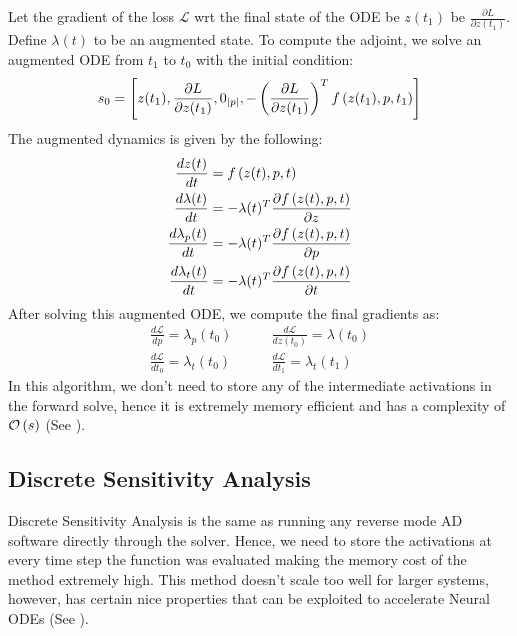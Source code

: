 Let the gradient of the loss $\mathcal{L}$ wrt the final state of the ODE be $z(t_1)$ be $\frac{\partial L}{\partial z(t_1)}$. Define $\lambda(t)$ to be an augmented state. To compute the adjoint, we solve an augmented ODE from $t_1$ to $t_0$ with the initial condition:
%
\begin{equation}
  s_0 = \left[ z(t_1), \frac{\partial L}{\partial z(t_1)}, 0_{|p|}, -\left(\frac{\partial L}{\partial z(t_1)}\right)^T f\left(z(t_1), p, t_1\right)\right]
\end{equation}
%
The augmented dynamics is given by the following:
%
\begin{align}
  \frac{dz(t)}{dt}         & = f\left(z(t), p, t\right)                                           \\
  \frac{d\lambda(t)}{dt}   & = -\lambda(t)^T \frac{\partial f\left(z(t), p, t\right)}{\partial z} \\
  \frac{d\lambda_p(t)}{dt} & = -\lambda(t)^T \frac{\partial f\left(z(t), p, t\right)}{\partial p} \\
  \frac{d\lambda_t(t)}{dt} & = -\lambda(t)^T \frac{\partial f\left(z(t), p, t\right)}{\partial t}
\end{align}
%
After solving this augmented ODE, we compute the final gradients as:
%
\begin{align}
  \frac{d\mathcal{L}}{dp} = \lambda_p(t_0)   & \qquad \frac{d\mathcal{L}}{dz(t_0)} = \lambda(t_0) \\
  \frac{d\mathcal{L}}{dt_0} = \lambda_t(t_0) & \qquad \frac{d\mathcal{L}}{dt_1} = \lambda_t(t_1)
\end{align}
%
In this algorithm, we don't need to store any of the intermediate activations in the forward solve, hence it is extremely memory efficient and has a complexity of $\mathcal{O}\left(s\right)$ (See ).

\subsection{Discrete Sensitivity Analysis}
\label{subsec:discrete_sensitivity_analysis_odes}

Discrete Sensitivity Analysis is the same as running any reverse mode AD software directly through the solver. Hence, we need to store the activations at every time step the function was evaluated making the memory cost of the method extremely high. This method doesn't scale too well for larger systems, however, has certain nice properties that can be exploited to accelerate Neural ODEs (See ).

